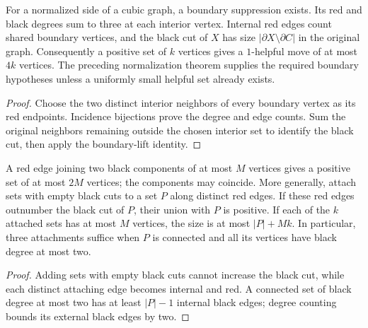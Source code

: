 \begin{theorem}
  \label{thm:lowerbounds-algebraic-suppression}
  \leanok
  For a normalized side of a cubic graph, a boundary suppression exists.
  Its red and black degrees sum to three at each interior vertex.
  Internal red edges count shared boundary vertices, and the black cut of
  $X$ has size $|\partial X\setminus\partial C|$ in the original graph.
  Consequently a positive set of $k$ vertices gives a $1$-helpful move
  of at most $4k$ vertices. The preceding normalization theorem supplies
  the required boundary hypotheses unless a uniformly small helpful set
  already exists.
\end{theorem}
\begin{proof}
  \leanok
  Choose the two distinct interior neighbors of every boundary vertex
  as its red endpoints. Incidence bijections prove the degree and edge
  counts. Sum the original neighbors remaining outside the chosen interior
  set to identify the black cut, then apply the boundary-lift identity.
\end{proof}

\begin{theorem}
  \label{thm:lowerbounds-algebraic-red-black-components}
  \leanok
  A red edge joining two black components of at most $M$ vertices gives
  a positive set of at most $2M$ vertices; the components may coincide.
  More generally, attach sets with empty black cuts to a set $P$ along
  distinct red edges. If these red edges outnumber the black cut of $P$,
  their union with $P$ is positive. If each of the $k$ attached sets has
  at most $M$ vertices, the size is at most $|P|+Mk$.
  In particular, three attachments suffice when $P$ is connected and all
  its vertices have black degree at most two.
\end{theorem}
\begin{proof}
  \leanok
  Adding sets with empty black cuts cannot increase the black cut, while
  each distinct attaching edge becomes internal and red. A connected set
  of black degree at most two has at least $|P|-1$ internal black edges;
  degree counting bounds its external black edges by two.
\end{proof}

